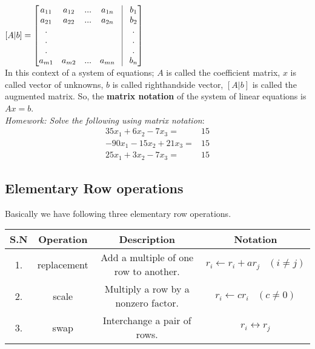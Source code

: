 \documentclass[math101_lecturenotes_ku.tex]{subfiles}
\begin{document}
$\displaystyle
[A|b]= \left[
    \begin{matrix}
    a_{11} & a_{12} & ... & a_{1n} \\
    a_{21} & a_{22} & ... & a_{2n}\\
    .\\
    .\\
    .\\
    a_{m1} & a_{m2} & ... & a_{mn}
\end{matrix} \;\;\; \vline \;\;\; \begin{matrix}
    b_1 \\
    b_2 \\
    .\\
    .\\
    .\\
    b_n
\end{matrix} \right ]
$ \\[5mm]
In this context of a system of equations; $A$ is called the coefficient matrix, $x$ is called vector of unknowns, $b$ is called righthandside vector, $[A|b]$ is called the augmented matrix.
So, the \textbf{\large matrix notation} of the system of linear equations is \textbf{$\displaystyle Ax=b$}. \\
\textit{Homework: Solve the following using matrix notation}:
\begin{align*}
    35x_1+6x_2-7x_3 =& 15 \\
    -90x_1-15x_2+21x_3 =& 15 \\
     25x_1+3x_2-7x_3 =& 15
\end{align*}

\subsection{Elementary Row operations}
Basically we have following three elementary row operations.

\begin{table}[ht!]
    \centering
    \begin{tabular}{|c|c|c|c|}
    \hline
        S.N & Operation & Description & Notation  \\
        \hline
        1. & replacement & Add a multiple of one row to another. & $r_i \leftarrow r_i+ar_j \;\;\; (i \neq j)$ \\
        2. & scale & Multiply a row by a nonzero factor. & $r_i \leftarrow cr_i \;\;\;(c\neq 0)$ \\
        3. & swap & Interchange a pair of rows. & $r_i \leftrightarrow r_j$\\
        \hline
    \end{tabular}
\end{table}
\vspace{-5mm}
\end{document}
